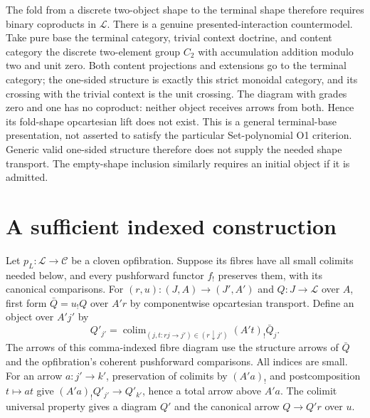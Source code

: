 \documentclass[11pt]{article}
\begin{document}
The fold from a discrete two-object shape to the terminal shape therefore requires binary coproducts in $\mathcal L$. There is a genuine presented-interaction countermodel. Take pure base the terminal category, trivial context doctrine, and content category the discrete two-element group $C_2$ with accumulation addition modulo two and unit zero. Both content projections and extensions go to the terminal category; the one-sided structure is exactly this strict monoidal category, and its crossing with the trivial context is the unit crossing. The diagram with grades zero and one has no coproduct: neither object receives arrows from both. Hence its fold-shape opcartesian lift does not exist. This is a general terminal-base presentation, not asserted to satisfy the particular Set-polynomial O1 criterion. Generic valid one-sided structure therefore does not supply the needed shape transport. The empty-shape inclusion similarly requires an initial object if it is admitted.

\section{A sufficient indexed construction}
Let $p_L:\mathcal L\to\mathcal C$ be a cloven opfibration. Suppose its fibres have all small colimits needed below, and every pushforward functor $f_!$ preserves them, with its canonical comparisons. For $(r,u):(J,A)\to(J',A')$ and $Q:J\to\mathcal L$ over $A$, first form $\bar Q=u_!Q$ over $A'r$ by componentwise opcartesian transport. Define an object over $A'j'$ by
\[
 Q'_{j'}=\mathop{\mathrm{colim}}_{(j,t:rj\to j')\in(r\downarrow j')}
       (A't)_!\bar Q_j.\tag{K}
\]
The arrows of this comma-indexed fibre diagram use the structure arrows of $\bar Q$ and the opfibration's coherent pushforward comparisons. All indices are small. For an arrow $a:j'\to k'$, preservation of colimits by $(A'a)_!$ and postcomposition $t\mapsto at$ give $(A'a)_!Q'_{j'}\to Q'_{k'}$, hence a total arrow above $A'a$. The colimit universal property gives a diagram $Q'$ and the canonical arrow $Q\to Q'r$ over $u$.
\end{document}
